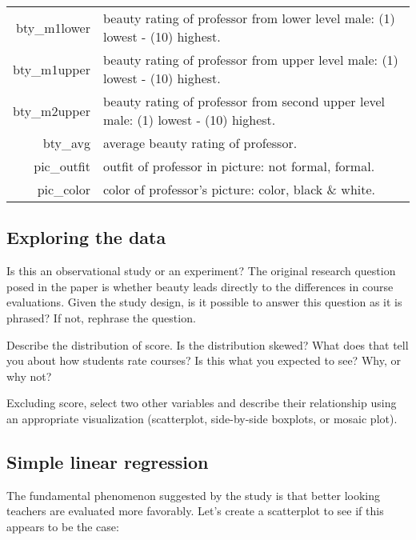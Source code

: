 \documentclass{article}\usepackage[]{graphicx}\usepackage[]{color}
\newcommand{\hlstd}[1]{\textcolor[rgb]{0.345,0.345,0.345}{#1}}%
\begin{document}
\begin{table}[h]
\begin{tabular}{r | l}
\hlstd{bty\_m1lower} & beauty rating of professor from lower level male: (1) lowest - (10) highest. \\
\hlstd{bty\_m1upper} & beauty rating of professor from upper level male: (1) lowest - (10) highest. \\
\hlstd{bty\_m2upper} & beauty rating of professor from second upper level male: (1) lowest - (10) highest. \\
\hlstd{bty\_avg} & average beauty rating of professor. \\
\hlstd{pic\_outfit} & outfit of professor in picture: not formal, formal. \\
\hlstd{pic\_color} & color of professor's picture: color, black \& white. \\
\end{tabular}
\end{table}

\subsection*{Exploring the data}

\begin{exercise}
Is this an observational study or an experiment?  The original research question posed in the paper is whether beauty leads directly to the differences in course evaluations.  Given the study design, is it possible to answer this question as it is phrased?  If not, rephrase the question.
\end{exercise}

\begin{exercise}
Describe the distribution of \hlstd{score}.  Is the distribution skewed?  What does that tell you about how students rate courses?  Is this what you expected to see?  Why, or why not?
\end{exercise}

\begin{exercise}
Excluding \hlstd{score}, select two other variables and describe their relationship using an appropriate visualization (scatterplot, side-by-side boxplots, or mosaic plot).
\end{exercise}

\subsection*{Simple linear regression}

The fundamental phenomenon suggested by the study is that better looking teachers are evaluated more favorably.  Let's create a scatterplot to see if this appears to be the case:
\end{document}
